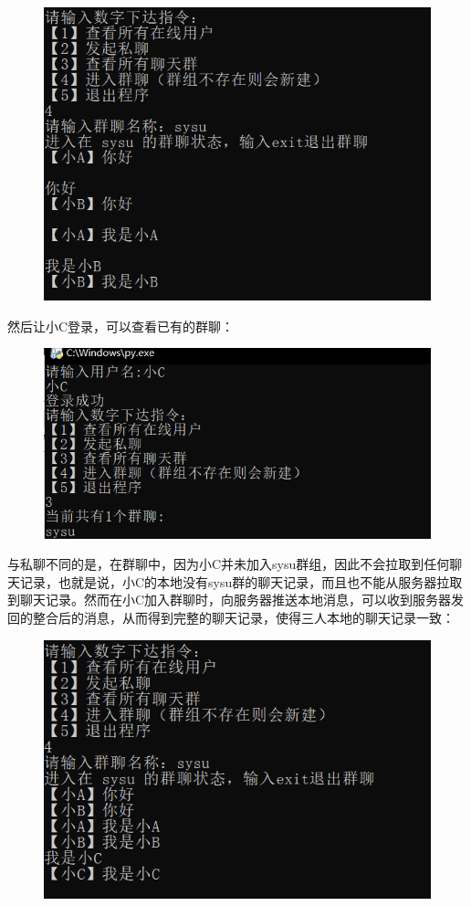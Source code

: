\documentclass{report}
\begin{document}
\begin{figure}[H]\centering
\includegraphics[scale=0.3]{pic/8.png}
\end{figure}
然后让小C登录，可以查看已有的群聊：

\begin{figure}[H]\centering
\includegraphics[scale=0.3]{pic/9.png}
\end{figure}
与私聊不同的是，在群聊中，因为小C并未加入sysu群组，因此不会拉取到任何聊天记录，也就是说，小C的本地没有sysu群的聊天记录，而且也不能从服务器拉取到聊天记录。然而在小C加入群聊时，向服务器推送本地消息，可以收到服务器发回的整合后的消息，从而得到完整的聊天记录，使得三人本地的聊天记录一致：

\begin{figure}[H]\centering
\includegraphics[scale=0.3]{pic/10.png}
\end{figure}
\end{document}
